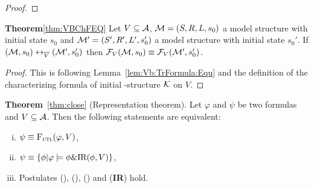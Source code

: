 \documentclass{article}
\begin{document}
\begin{proof}
\end{proof}

\textbf{Theorem}\ref{thm:VBChFEQ} Let $V\subseteq {\cal A}$, ${\cal M}=(S,R,L,s_0)$ a model structure with initial state $s_0$
and ${\cal M}'=(S',R', L',s_0')$ a model structure with initial state $s_0'$.
If $({\cal M},s_0) \leftrightarrow_{\overline V} ({\cal M}',s_0')$ then ${\cal F}_V({\cal M}, s_0) \equiv {\cal F}_V({\cal M}', s_0')$.\\
\begin{proof}
This is following Lemma~\ref{lem:Vb:TrFormula:Equ} and the definition of the characterizing formula of initial \MPK-structure ${\cal K}$ on $V$.
\end{proof}


\textbf{Theorem}~\ref{thm:close}
(Representation theorem).
Let $\varphi$ and $\psi$ be two formulas and $V \subseteq {\cal A}$.
Then the following statements are equivalent:
\begin{enumerate}[(i)]
  \item $\psi \equiv {\textsc{F}_{\textsc{ctl}}}(\varphi, V)$,
  \item $\psi \equiv \{\phi | \varphi \models \phi \& \textrm{IR}(\phi, V)\}$,
  \item Postulates (\W), (\PP), (\NgP) and (\textbf{IR}) hold.
\end{enumerate}
\end{document}
